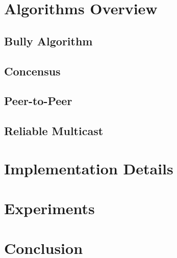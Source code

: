 \documentclass[10pt,twocolumn,letterpaper]{article}
\begin{document}
\section{Algorithms Overview}
\subsection{Bully Algorithm}
\subsection{Concensus}
\subsection{Peer-to-Peer}
\subsection{Reliable Multicast}
\section{Implementation Details}
\section{Experiments}
\section{Conclusion}
    
{\small


}
\end{document}
